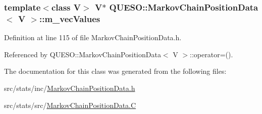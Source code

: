 \hypertarget{class_q_u_e_s_o_1_1_markov_chain_position_data_ad98640fe86c2c70671467686988c6b91}{
\subsubsection[{m\-\_\-vec\-Values}]{\setlength{\rightskip}{0pt plus 5cm}template$<$class V$>$ V$\ast$ {\bf Q\-U\-E\-S\-O\-::\-Markov\-Chain\-Position\-Data}$<$ V $>$\-::m\-\_\-vec\-Values\hspace{0.3cm}{\ttfamily [private]}}}\label{class_q_u_e_s_o_1_1_markov_chain_position_data_ad98640fe86c2c70671467686988c6b91}


Definition at line 115 of file Markov\-Chain\-Position\-Data.\-h.



Referenced by Q\-U\-E\-S\-O\-::\-Markov\-Chain\-Position\-Data$<$ V $>$\-::operator=().



The documentation for this class was generated from the following files\-:\begin{DoxyCompactItemize}
\item 
src/stats/inc/\hyperlink{_markov_chain_position_data_8h}{Markov\-Chain\-Position\-Data.\-h}\item 
src/stats/src/\hyperlink{_markov_chain_position_data_8_c}{Markov\-Chain\-Position\-Data.\-C}\end{DoxyCompactItemize}
